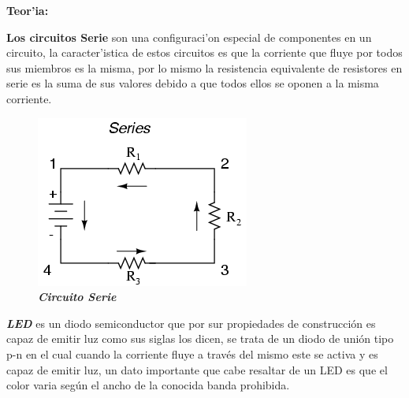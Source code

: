 \documentclass[11pt, letterpaper]{report}
\newenvironment{block}[1]{\hspace{-0.8 cm}\textbf{\Large #1}}{\vspace{3 mm}} %
\begin{document}
	\begin{block}{Teor'ia:}
	
		\textbf{Los circuitos Serie} son una configuraci'on especial de componentes en un circuito, la caracter'istica de estos circuitos es que la corriente que fluye por todos sus miembros es la misma, por lo mismo la resistencia equivalente de resistores en serie es la suma de sus valores debido a que todos ellos se oponen a la misma corriente.
	  
		\begin{figure}[H]
		\hfill\includegraphics[scale=0.5]{serie.png}\hspace*{\fill}
		\caption{\textbf{\emph{Circuito Serie}}}
		\end{figure}
		
		\textbf{\emph{LED}} es un diodo semiconductor que por sur propiedades de construcci\'on es capaz de emitir luz como sus siglas los dicen, se trata de un diodo de uni\'on tipo p-n en el cual cuando la corriente fluye a trav\'es del mismo este se activa y es capaz de emitir luz, un dato importante que cabe resaltar de un LED es que el color varia según el ancho de la conocida banda prohibida.
		

\end{block}
\end{document}
